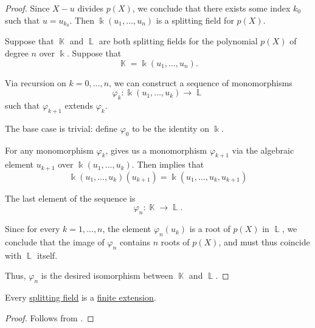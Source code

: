 \begin{proof}
  Since \( X - u \) divides \( p(X) \), we conclude that there exists some index \( k_0 \) such that \( u = u_{k_0} \). Then \( \Bbbk(u_1, \ldots, u_n) \) is a splitting field for \( p(X) \).

  \UniquenessSubProof Suppose that \( \BbbK \) and \( \BbbL \) are both splitting fields for the polynomial \( p(X) \) of degree \( n \) over \( \Bbbk \). Suppose that
  \begin{equation*}
    \BbbK = \Bbbk(u_1, \ldots, u_n).
  \end{equation*}

  Via recursion on \( k = 0, \ldots, n \), we can construct a sequence of monomorphisms
  \begin{equation*}
    \varphi_k: \Bbbk(u_1, \ldots, u_k) \to \BbbL
  \end{equation*}
  such that \( \varphi_{k+1} \) extends \( \varphi_k \).

  The base case is trivial: define \( \varphi_0 \) to be the identity on \( \Bbbk \).

  For any monomorphism \( \varphi_k \),  gives us a monomorphism \( \varphi_{k+1} \) via the algebraic element \( u_{k+1} \) over \( \Bbbk(u_1, \ldots, u_k) \). Then  implies that
  \begin{equation*}
    \Bbbk(u_1, \ldots, u_k)(u_{k+1})
    =
    \Bbbk(u_1, \ldots, u_k, u_{k+1})
  \end{equation*}

  The last element of the sequence is
  \begin{equation*}
    \varphi_n: \BbbK \to \BbbL.
  \end{equation*}

  Since for every \( k = 1, \ldots, n \), the element \( \varphi_n(u_k) \) is a root of \( p(X) \) in \( \BbbL \), we conclude that the image of \( \varphi_n \) contains \( n \) roots of \( p(X) \), and must thus coincide with \( \BbbL \) itself.

  Thus, \( \varphi_n \) is the desired isomorphism between \( \BbbK \) and \( \BbbL \).
\end{proof}

\begin{proposition}\label{thm:splitting_field_is_finite_extension}
  Every \hyperref[def:splitting_field]{splitting field} is a \hyperref[def:field_extension_degree]{finite extension}.
\end{proposition}
\begin{proof}
  Follows from .
\end{proof}

